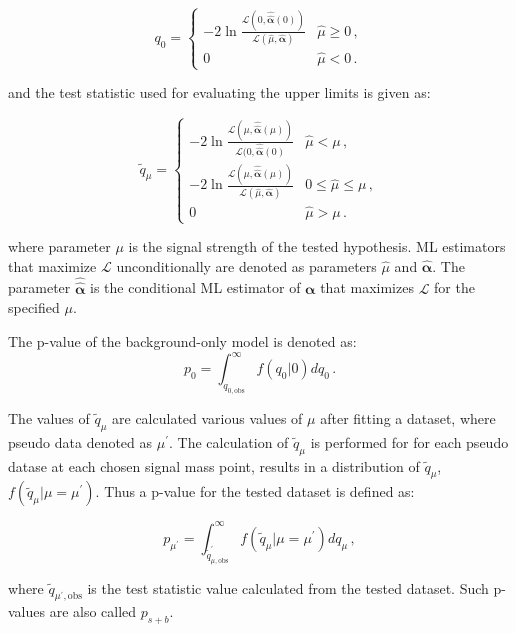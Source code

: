 \begin{equation}
q_0 = \left\{ 
\begin{array}{ll}
-2\ln\frac{\mathcal{L}(0,\hat{\hat{\bm\alpha}}(0))}
{\mathcal{L}(\hat{\mu},\hat{\bm\alpha})} 
& \hat{\mu} \ge 0\, ,\\ 
0 & \hat{\mu} < 0\, .
\end{array}
\right.
\end{equation}

\noindent
and the test statistic used for evaluating the upper limits is given as:

\begin{equation}
\tilde{q}_\mu = \left\{ 
\begin{array}{ll}
-2\ln\frac{\mathcal{L}(\mu,\hat{\hat{\bm\alpha}}(\mu))}
{\mathcal{L}(0,\hat{\hat{\bm\alpha}}(0)}
& \hat{\mu} < \mu\, ,\\ 
-2\ln\frac{\mathcal{L}(\mu,\hat{\hat{\bm\alpha}}(\mu))}
{\mathcal{L}(\hat{\mu},\hat{\bm\alpha})} 
& 0 \le \hat{\mu} \le \mu\, ,\\ 
0 & \hat{\mu} > \mu\, .
\end{array}
\right.
\end{equation}

\noindent
where parameter $\mu$ is the signal strength of the tested hypothesis. ML
estimators that maximize $\mathcal{L}$ unconditionally are denoted as parameters $\hat{\mu}$ and $\hat{\bm\alpha}$. The parameter $\hat{\hat{\bm\alpha}}$ is the conditional ML estimator
of $\bm\alpha$ that maximizes $\mathcal{L}$ for the specified $\mu$.

The p-value of the background-only model is denoted as:
\begin{equation}
p_0 = \int_{q_{0,\mathrm{obs}}}^\infty
f(q_0|0) dq_0\, .
\end{equation}

The values of
$\tilde{q}_\mu$ are calculated various values of $\mu$ after fitting a dataset, where pseudo data denoted as $\mu^\prime$. The calculation of $\tilde{q}_\mu$ is performed for for each pseudo datase at each chosen signal mass point, results in a distribution of $\tilde{q}_\mu$,
$f(\tilde{q}_\mu|\mu = \mu^\prime)$. Thus a p-value for the tested dataset is defined as:

\begin{equation}
p_{\mu^\prime} = \int_{\tilde{q}^\prime_{\mu,\mathrm{obs}}}^\infty
f(\tilde{q}_\mu|\mu = \mu^\prime) dq_\mu\, ,
\end{equation}

\noindent
where $\tilde{q}_{\mu^\prime,\mathrm{obs}}$ is the test statistic value
calculated from the tested dataset. 
Such p-values are also called $p_{s+b}$.

